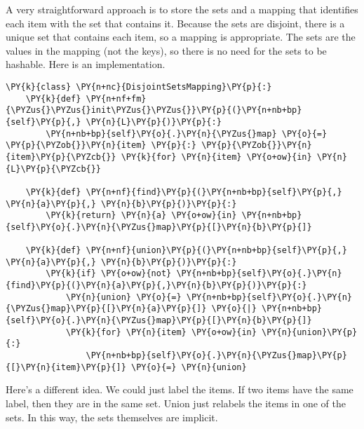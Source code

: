 A very straightforward approach is to store the sets and a mapping that identifies each item with the set that contains it.
Because the sets are disjoint, there is a unique set that contains each item, so a mapping is appropriate.
The sets are the values in the mapping (not the keys), so there is no need for the sets to be hashable.
Here is an implementation.

\begin{Verbatim}[commandchars=\\\{\}]
\PY{k}{class} \PY{n+nc}{DisjointSetsMapping}\PY{p}{:}
    \PY{k}{def} \PY{n+nf+fm}{\PYZus{}\PYZus{}init\PYZus{}\PYZus{}}\PY{p}{(}\PY{n+nb+bp}{self}\PY{p}{,} \PY{n}{L}\PY{p}{)}\PY{p}{:}
        \PY{n+nb+bp}{self}\PY{o}{.}\PY{n}{\PYZus{}map} \PY{o}{=} \PY{p}{\PYZob{}}\PY{n}{item} \PY{p}{:} \PY{p}{\PYZob{}}\PY{n}{item}\PY{p}{\PYZcb{}} \PY{k}{for} \PY{n}{item} \PY{o+ow}{in} \PY{n}{L}\PY{p}{\PYZcb{}}

    \PY{k}{def} \PY{n+nf}{find}\PY{p}{(}\PY{n+nb+bp}{self}\PY{p}{,} \PY{n}{a}\PY{p}{,} \PY{n}{b}\PY{p}{)}\PY{p}{:}
        \PY{k}{return} \PY{n}{a} \PY{o+ow}{in} \PY{n+nb+bp}{self}\PY{o}{.}\PY{n}{\PYZus{}map}\PY{p}{[}\PY{n}{b}\PY{p}{]}

    \PY{k}{def} \PY{n+nf}{union}\PY{p}{(}\PY{n+nb+bp}{self}\PY{p}{,} \PY{n}{a}\PY{p}{,} \PY{n}{b}\PY{p}{)}\PY{p}{:}
        \PY{k}{if} \PY{o+ow}{not} \PY{n+nb+bp}{self}\PY{o}{.}\PY{n}{find}\PY{p}{(}\PY{n}{a}\PY{p}{,}\PY{n}{b}\PY{p}{)}\PY{p}{:}
            \PY{n}{union} \PY{o}{=} \PY{n+nb+bp}{self}\PY{o}{.}\PY{n}{\PYZus{}map}\PY{p}{[}\PY{n}{a}\PY{p}{]} \PY{o}{|} \PY{n+nb+bp}{self}\PY{o}{.}\PY{n}{\PYZus{}map}\PY{p}{[}\PY{n}{b}\PY{p}{]}
            \PY{k}{for} \PY{n}{item} \PY{o+ow}{in} \PY{n}{union}\PY{p}{:}
                \PY{n+nb+bp}{self}\PY{o}{.}\PY{n}{\PYZus{}map}\PY{p}{[}\PY{n}{item}\PY{p}{]} \PY{o}{=} \PY{n}{union}
\end{Verbatim}



Here's a different idea.
We could just label the items.
If two items have the same label, then they are in the same set.
Union just relabels the items in one of the sets.
In this way, the sets themselves are implicit.

